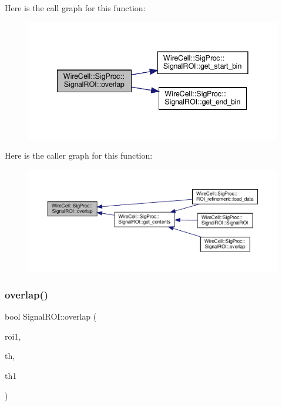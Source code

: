 Here is the call graph for this function\+:
\nopagebreak
\begin{figure}[H]
\begin{center}
\leavevmode
\includegraphics[width=341pt]{class_wire_cell_1_1_sig_proc_1_1_signal_r_o_i_a2b79f88f3551f06ccb3f61aaa00da118_cgraph}
\end{center}
\end{figure}
Here is the caller graph for this function\+:
\nopagebreak
\begin{figure}[H]
\begin{center}
\leavevmode
\includegraphics[width=350pt]{class_wire_cell_1_1_sig_proc_1_1_signal_r_o_i_a2b79f88f3551f06ccb3f61aaa00da118_icgraph}
\end{center}
\end{figure}
\mbox{\label{class_wire_cell_1_1_sig_proc_1_1_signal_r_o_i_af714fd2a4bba4597bea27d2ab34f0d8d}} 
\subsubsection{\texorpdfstring{overlap()}{overlap()}\hspace{0.1cm}{\footnotesize\ttfamily [2/2]}}
{\footnotesize\ttfamily bool Signal\+R\+O\+I\+::overlap (\begin{DoxyParamCaption}\item[{\hyperlink{class_wire_cell_1_1_sig_proc_1_1_signal_r_o_i}{Signal\+R\+OI} $\ast$}]{roi1,  }\item[{float}]{th,  }\item[{float}]{th1 }\end{DoxyParamCaption})}



